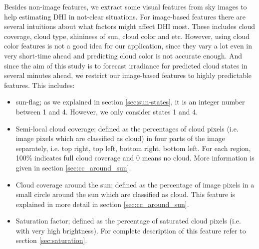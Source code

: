 Besides non-image features, we extract some visual features from sky images to help estimating DHI in not-clear situations. For image-based features there are several intuitions about what factors might affect DHI most. These includes cloud coverage, cloud type, shininess of sun, cloud color and etc. However, using cloud color features is not a good idea for our application, since they vary a lot even in very short-time ahead and predicting cloud color is not accurate enough. And since the aim of this study is to forecast irradiance for predicted cloud states in several minutes ahead, we restrict our image-based features to highly predictable features. This includes:
\begin{itemize}
\item sun-flag; as we explained in section \ref{sec:sun-states}, it is an integer number between 1 and 4. However, we only consider states 1 and 4. 
\item Semi-local cloud coverage; defined as the percentages of cloud pixels (i.e. image pixels which are classified as cloud) in four parts of the image separately, i.e. top right, top left, bottom right, bottom left. For each region, 100\% indicates full cloud coverage and 0 means no cloud. More information is given in section \ref{sec:cc_around_sun}.
\item Cloud coverage around the sun; defined as the percentage of image pixels in a small circle around the sun which are classified as cloud. This feature is explained in more detail in section \ref{sec:cc_around_sun}.
\item Saturation factor; defined as the percentage of saturated cloud pixels (i.e. with very high brightness). For complete description of this feature refer to section \ref{sec:saturation}.
\end{itemize}

